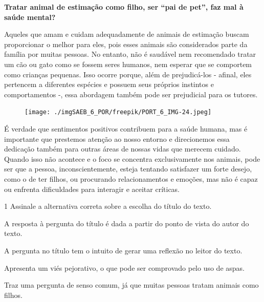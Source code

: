 \begin{myquote}
\begin{center}
\textbf{Tratar animal de estimação como filho, ser ``pai de pet'', faz mal à saúde mental?}\\
\end{center}


\noindent Aqueles que amam e cuidam adequadamente de animais de estimação buscam
proporcionar o melhor para eles, pois esses animais são considerados
parte da família por muitas pessoas. No entanto, não é saudável nem
recomendado tratar um cão ou gato como se fossem seres humanos, nem
esperar que se comportem como crianças pequenas. Isso ocorre porque,
além de prejudicá-los - afinal, eles pertencem a diferentes espécies e
possuem seus próprios instintos e comportamentos -, essa abordagem também
pode ser prejudicial para os tutores.

\begin{figure}[H]
\centering\texttt{[image: ./imgSAEB\_6\_POR/freepik/PORT\_6\_IMG-24.jpeg]}
\end{figure}

É verdade que sentimentos positivos contribuem para a saúde humana, mas
é importante que prestemos atenção ao nosso entorno e direcionemos essa
dedicação também para outras áreas de nossas vidas que merecem cuidado.
Quando isso não acontece e o foco se concentra exclusivamente nos
animais, pode ser que a pessoa, inconscientemente, esteja tentando
satisfazer um forte desejo, como o de ter filhos, ou procurando
relacionamentos e emoções, mas não é capaz ou enfrenta dificuldades para
interagir e aceitar críticas.

\end{myquote}

\num{1} Assinale a alternativa correta sobre a escolha do título do texto.

\begin{escolha}
\item A resposta à pergunta do título é dada a partir do ponto de vista do
autor do texto.
\item A pergunta no título tem o intuito de gerar uma reflexão no leitor do
texto.
\item Apresenta um viés pejorativo, o que pode ser comprovado pelo uso de
aspas.
\item Traz uma pergunta de senso comum, já que muitas pessoas tratam
animais como filhos. 
\end{escolha}

